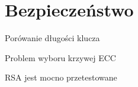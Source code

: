 \section{Bezpieczeństwo}

\begin{frame}{Porówanie długości klucza}
\end{frame}

\begin{frame}{Problem wyboru krzywej ECC}
\end{frame}

\begin{frame}{RSA jest mocno przetestowane}
\end{frame}
